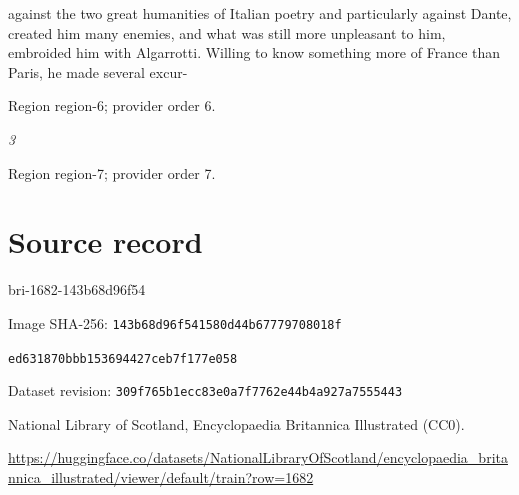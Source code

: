 \documentclass[11pt]{article}
\begin{document}
against the two great humanities of Italian poetry and particularly against Dante, created him many enemies, and what was still more unpleasant to him, embroided him with Algarrotti. Willing to know something more of France than Paris, he made several excur-
\par

{\scriptsize\color{gray} Region region-6; provider order 6.\par}
\medskip

{\small\itshape 3\par}

{\scriptsize\color{gray} Region region-7; provider order 7.\par}
\medskip
\newpage\section*{Source record}
bri-1682-143b68d96f54\par
Image SHA-256: \texttt{143b68d96f541580d44b67779708018f}\par\texttt{ed631870bbb153694427ceb7f177e058}\par
Dataset revision: \texttt{309f765b1ecc83e0a7f7}\texttt{762e44b4a927a7555443}\par
National Library of Scotland, Encyclopaedia Britannica Illustrated (CC0).\par
\url{https://huggingface.co/datasets/NationalLibraryOfScotland/encyclopaedia_britannica_illustrated/viewer/default/train?row=1682}
\end{document}
